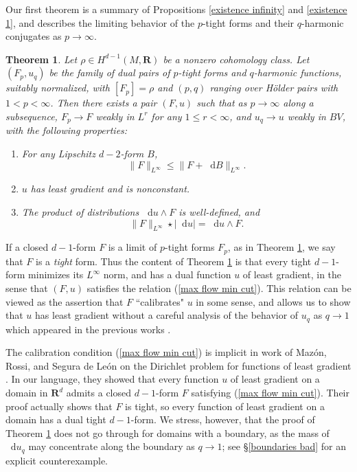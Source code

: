 \documentclass[reqno,11pt]{amsart}
\newcommand{\RR}{\mathbf{R}}
\newcommand*\dif{\mathop{}\!\mathrm{d}}
\newcommand{\dfn}[1]{\emph{#1}\index{#1}}
\newtheorem{mainthm}{Theorem}
\theoremstyle{definition}
\numberwithin{equation}{section}
\begin{document}
Our first theorem is a summary of Propositions \ref{existence infinity} and \ref{existence 1}, and describes the limiting behavior of the $p$-tight forms and their $q$-harmonic conjugates as $p \to \infty$.

\begin{mainthm}\label{existence of infinity tight forms}
Let $\rho \in H^{d - 1}(M, \RR)$ be a nonzero cohomology class.
Let $(F_p, u_q)$ be the family of dual pairs of $p$-tight forms and $q$-harmonic functions, suitably normalized, with $[F_p] = \rho$ and $(p, q)$ ranging over H\"older pairs with $1 < p < \infty$.
Then there exists a pair $(F, u)$ such that as $p \to \infty$ along a subsequence, $F_p \to F$ weakly in $L^r$ for any $1 \leq r < \infty$, and $u_q \to u$ weakly in $BV$, with the following properties:
\begin{enumerate}
\item For any Lipschitz $d - 2$-form $B$, 
\begin{equation}\label{best comass}
\|F\|_{L^\infty} \leq \|F + \dif B\|_{L^\infty}.
\end{equation}
\item $u$ has least gradient and is nonconstant.
\item The product of distributions $\dif u \wedge F$ is well-defined, and
\begin{equation}\label{max flow min cut}
\|F\|_{L^\infty} \star |\dif u| = \dif u \wedge F.
\end{equation}
\end{enumerate}
\end{mainthm}

If a closed $d - 1$-form $F$ is a limit of $p$-tight forms $F_p$, as in Theorem \ref{existence of infinity tight forms}, we say that $F$ is a \dfn{tight} form.
Thus the content of Theorem \ref{existence of infinity tight forms} is that every tight $d - 1$-form minimizes its $L^\infty$ norm, and has a dual function $u$ of least gradient, in the sense that $(F, u)$ satisfies the relation (\ref{max flow min cut}).
This relation can be viewed as the assertion that $F$ ``calibrates" $u$ in some sense, and allows us to show that $u$ has least gradient without a careful analysis of the behavior of $u_q$ as $q \to 1$ which appeared in the previous works \cite{daskalopoulos2020transverse,daskalopoulos2022,Mazon14}.

The calibration condition (\ref{max flow min cut}) is implicit in work of Maz\'on, Rossi, and Segura de Le\'on on the Dirichlet problem for functions of least gradient \cite{Mazon14}.
In our language, they showed that every function $u$ of least gradient on a domain in $\RR^d$ admits a closed $d - 1$-form $F$ satisfying (\ref{max flow min cut}).
Their proof actually shows that $F$ is tight, so every function of least gradient on a domain has a dual tight $d - 1$-form.
We stress, however, that the proof of Theorem \ref{existence of infinity tight forms} does not go through for domains with a boundary, as the mass of $\dif u_q$ may concentrate along the boundary as $q \to 1$; see \S\ref{boundaries bad} for an explicit counterexample.
\end{document}
